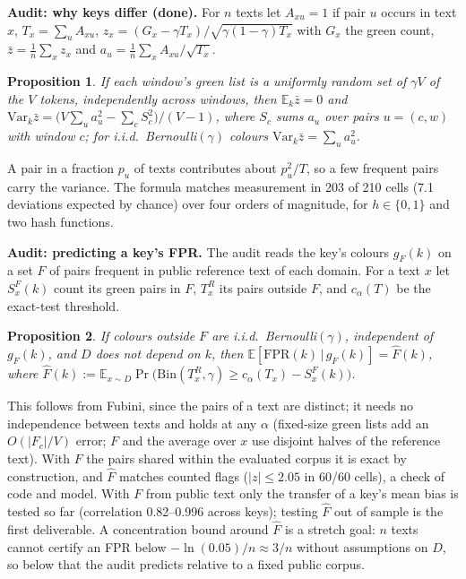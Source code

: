 \documentclass{article}
\theoremstyle{plain}
\newtheorem{proposition}{Proposition}
\newcommand{\FPR}{\mathrm{FPR}}
\newcommand{\E}{\mathbb{E}}
\newcommand{\Bin}{\mathrm{Bin}}
\begin{document}
\textbf{Audit: why keys differ (done).} For $n$ texts let \mbox{$A_{xu}=1$} if pair $u$ occurs in text $x$, $T_x=\sum_uA_{xu}$, $z_x=(G_x-\gamma T_x)/\sqrt{\gamma(1-\gamma)T_x}$ with $G_x$ the green count, $\bar z=\frac1n\sum_xz_x$ and $a_u=\frac1n\sum_xA_{xu}/\sqrt{T_x}$.
\begin{proposition}
\label{prop:var}
If each window's green list is a uniformly random set of $\gamma V$ of the $V$ tokens, independently across windows, then $\E_k\bar z=0$ and $\mathrm{Var}_k\bar z=\big(V\sum_ua_u^2-\sum_cS_c^2\big)/(V-1)$, where $S_c$ sums $a_u$ over pairs $u=(c,w)$ with window $c$; for i.i.d.\ Bernoulli$(\gamma)$ colours $\mathrm{Var}_k\bar z=\sum_ua_u^2$.
\end{proposition}
A pair in a fraction $p_u$ of texts contributes about $p_u^2/T$, so a few frequent pairs carry the variance. The formula matches measurement in 203 of 210 cells (7.1 deviations expected by chance) over four orders of magnitude, for $h\in\{0,1\}$ and two hash functions.

\textbf{Audit: predicting a key's FPR.} The audit reads the key's colours $g_F(k)$ on a set $F$ of pairs frequent in public reference text of each domain. For a text $x$ let $S^F_x(k)$ count its green pairs in $F$, $T^R_x$ its pairs outside $F$, and $c_\alpha(T)$ be the exact-test threshold.
\begin{proposition}
\label{prop:pred}
If colours outside $F$ are i.i.d.\ Bernoulli$(\gamma)$, independent of $g_F(k)$, and $D$ does not depend on $k$, then $\E[\FPR(k)\,|\,g_F(k)]=\hat F(k)$, where $\hat F(k):=\E_{x\sim D}\Pr\big(\Bin(T^R_x,\gamma)\ge c_\alpha(T_x)-S^F_x(k)\big)$.
\end{proposition}
This follows from Fubini, since the pairs of a text are distinct; it needs no independence between texts and holds at any $\alpha$ (fixed-size green lists add an $O(|F_c|/V)$ error; $F$ and the average over $x$ use disjoint halves of the reference text). With $F$ the pairs shared within the evaluated corpus it is exact by construction, and $\hat F$ matches counted flags ($|z|\le2.05$ in 60/60 cells), a check of code and model. With $F$ from public text only the transfer of a key's mean bias is tested so far (correlation 0.82--0.996 across keys); testing $\hat F$ out of sample is the first deliverable. A concentration bound around $\hat F$ \citep{freedman1975tail} is a stretch goal: $n$ texts cannot certify an FPR below $-\ln(0.05)/n\approx3/n$ without assumptions on $D$, so below that the audit predicts relative to a fixed public corpus.
\end{document}
